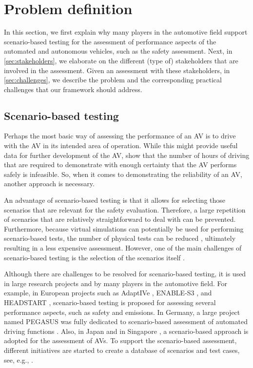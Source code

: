 \section{Problem definition}
\label{sec:problem}

In this section, we first explain why many players in the automotive field support scenario-based testing for the assessment of performance aspects of the automated and autonomous vehicles, such as the safety assessment. Next, in \cref{sec:stakeholders}, we elaborate on the different (type of) stakeholders that are involved in the assessment. Given an assessment with these stakeholders, in \cref{sec:challenges}, we describe the problem and the corresponding practical challenges that our framework should address.



\subsection{Scenario-based testing}
\label{sec:scenario-based testing}

Perhaps the most basic way of assessing the performance of an AV is to drive with the AV in its intended area of operation. While this might provide useful data for further development of the AV, \textcite{kalra2016driving,wachenfeld2016release} show that the number of hours of driving that are required to demonstrate with enough certainty that the AV performs safely is infeasible. So, when it comes to demonstrating the reliability of an AV, another approach is necessary.

An advantage of scenario-based testing is that it allows for selecting those scenarios that are relevant for the safety evaluation. Therefore, a large repetition of scenarios that are relatively straightforward to deal with can be prevented. Furthermore, because virtual simulations can potentially be used for performing scenario-based tests, the number of physical tests can be reduced \autocite{ploeg2018cetran}, ultimately resulting in a less expensive assessment. However, one of the main challenges of scenario-based testing is the selection of the scenarios itself \autocite{riedmaier2020survey}. 

Although there are challenges to be resolved for scenario-based testing, it is used in large research projects and by many players in the automotive field. For example, in European projects such as AdaptIVe \autocite{roesener2017comprehensive}, ENABLE-S3 \autocite{leitner2019validation}, and HEADSTART \autocite{wagener2020headstart}, scenario-based testing is proposed for assessing several performance aspects, such as safety and emissions. In Germany, a large project named PEGASUS was fully dedicated to scenario-based assessment of automated driving functions \autocite{pegasus2019}. Also, in Japan \autocite{jacobo2019development} and in Singapore \autocite{cetran2020}, a scenario-based approach is adopted for the assessment of AVs. To support the scenario-based assessment, different initiatives are started to create a database of scenarios and test cases, see, e.g., \autocite{elrofai2018scenario,myers2020pass}.


